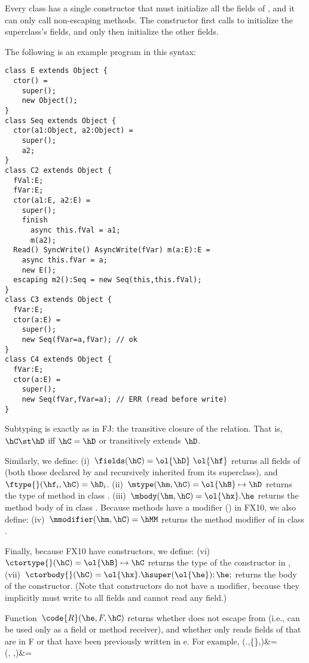 \documentclass[a4paper]{article}
\newcommand{\R}[2]{\code{R}(#1,#2,\hC)}
\begin{document}
Every class has a single constructor that must initialize all the fields of \this,
    and it can only call non-escaping methods.
The constructor first calls \super to initialize the superclass's fields,
    and only then initialize the other fields.

The following is an example program in this syntax:

\begin{lstlisting}
class E extends Object {
  ctor() =
    super();
    new Object();
}
class Seq extends Object {
  ctor(a1:Object, a2:Object) =
    super();
    a2;
}
class C2 extends Object {
  fVal:E;
  fVar:E;
  ctor(a1:E, a2:E) =
    super();
    finish
      async this.fVal = a1;
      m(a2);
  Read() SyncWrite() AsyncWrite(fVar) m(a:E):E =
    async this.fVar = a;
    new E();
  escaping m2():Seq = new Seq(this,this.fVal);
}
class C3 extends Object {
  fVar:E;
  ctor(a:E) =
    super();
    new Seq(fVar=a,fVar); // ok
}
class C4 extends Object {
  fVar:E;
  ctor(a:E) =
    super();
    new Seq(fVar,fVar=a); // ERR (read before write)
}
\end{lstlisting}


{Subtyping} is exactly as in FJ:
    the transitive closure of the \hextends relation.
That is, $\hC \st \hD$ iff $\hC=\hD$ or \hC transitively extends $\hD$.

Similarly, we define:
(i)~$\fields(\hC)=\ol{\hD}~\ol{\hf}$ returns all fields of \hC (both those declared by \hC and recursively inherited from its superclass),
    and~$\ftype{}(\hf_i,\hC) =\hD_i$.
(ii)~$\mtype(\hm,\hC) = \ol{\hB}\mapsto\hD$ returns the type of method \hm in class \hC.
(iii)~$\mbody(\hm,\hC) = \ol{\hx}.\he$ returns the method body of \hm in class \hC.
Because methods have a modifier (\hMM) in FX10, we also define:
(iv)~$\mmodifier(\hm,\hC) = \hMM$ returns the method modifier of \hm in class \hC.

Finally, because FX10 have constructors, we define:
(vi)~$\ctortype{}(\hC) = \ol{\hB}\mapsto\hC$ returns the type of the constructor in \hC,
(vii)~$\ctorbody{}(\hC) = \ol{\hx}.\hsuper(\ol{\he});\he;$ returns the body of the constructor.
(Note that constructors do not have a modifier, because they implicitly must write to all fields and cannot read any field.)


Function~$\R{\he}{F}$ returns whether
    \this does not escape from \he (i.e., \this can be used only as a field or method receiver),
    and whether
    \he only reads fields of \this that are in F or that have been previously written in e.
For example,
    \R{\this.\hf}{\{\hf\}}&=\htrue\\
    \R{}{ \emptyset}&=\htrue\\
\eeq
\end{document}
